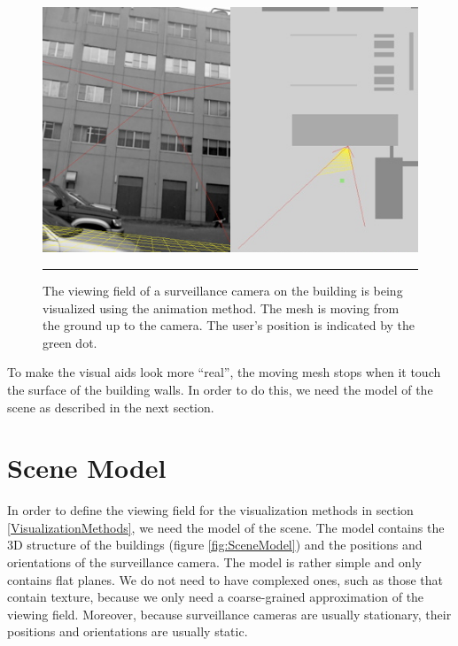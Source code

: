 \begin{figure}[htbp]
	\centering
	\includegraphics[width=14cm]{./Primitives/theory_animation.png}
	\rule{35em}{0.5pt}
	\caption[Animation method]{The viewing field of a surveillance camera on the building is being visualized using the animation method. The mesh is moving from the ground up to the camera. The user's position is indicated by the green dot.}
	\label{fig:AnimationMethod}
\end{figure}

To make the visual aids look more ``real'', the moving mesh stops when it touch the surface of the building walls. In order to do this, we need the model of the scene as described in the next section.

\section{Scene Model}
\label{SceneModel}

In order to define the viewing field for the visualization methods in section \ref{VisualizationMethods}, we need the model of the scene. The model contains the 3D structure of the buildings (figure \ref{fig:SceneModel}) and the positions and orientations of the surveillance camera. The model is rather simple and only contains flat planes. We do not need to have complexed ones, such as those that contain texture, because we only need a coarse-grained approximation of the viewing field. Moreover, because surveillance cameras are usually stationary, their positions and orientations are usually static.

